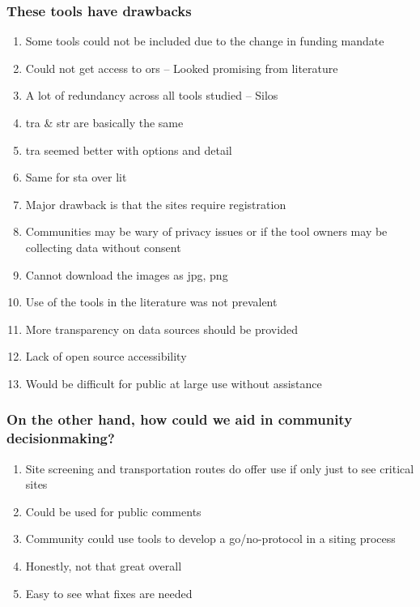 \documentclass[aspectratio=1610,pdftex,dvipsnames,compress,xcolor={dvipsnames}]{beamer}
\newcommand{\acs}{\acrshort} %
\begin{document}
\addtocounter{framenumber}{-1} 
\begin{frame}
    \frametitle{These tools have drawbacks} 
    \begin{enumerate}%
        \item[]Some tools could not be included due to the change in funding mandate
        \item[]Could not get access to \acs{ors} -- Looked promising from literature
        \item[]A lot of redundancy across all tools studied -- Silos
        \item[]\acs{tra} \& \acs{str} are basically the same
        \item[]\acs{tra} seemed better with options and detail
        \item[]Same for \acs{sta} over \acs{lit}
        \item[]Major drawback is that the sites require registration
        \item[]Communities may be wary of privacy issues or if the tool owners may be collecting data without consent
        \item[]Cannot download the images as jpg, png
        \item[]Use of the tools in the literature was not prevalent
        \item[]More transparency on data sources should be provided
        \item[]Lack of open source accessibility
        \item[]Would be difficult for public at large use without assistance
    \end{enumerate}
\end{frame}


\begin{frame}
    \frametitle{On the other hand, how could we aid in community decisionmaking?} 
    \begin{enumerate}%
        \item[]Site screening and transportation routes do offer use if only just to see critical sites
        \item[]Could be used for public comments
        \item[]Community could use tools to develop a go/no-protocol in a siting process
        \item[]Honestly, not that great overall
        \item[]Easy to see what fixes are needed
    \end{enumerate}
\end{frame}
\end{document}
